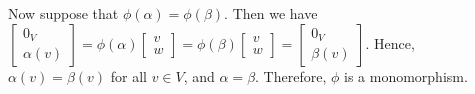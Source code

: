 \begin{solution}
Now suppose that $\phi(\alpha) = \phi(\beta)$.  Then we have $\begin{bmatrix}0_V\\\alpha(v)\end{bmatrix} = \phi(\alpha)\begin{bmatrix}v\\w\end{bmatrix} = \phi(\beta)\begin{bmatrix}v\\w\end{bmatrix} = \begin{bmatrix}0_V\\\beta(v)\end{bmatrix}$.  Hence, $\alpha(v) = \beta(v)$ for all $v\in V$, and $\alpha = \beta$.  Therefore, $\phi$ is a monomorphism.
\end{solution}

\probskip


